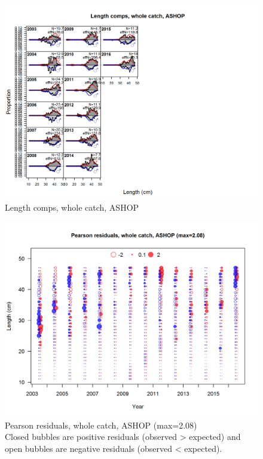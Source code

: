 \documentclass[12pt,]{article}
\begin{document}
\begin{figure}
\centering
\includegraphics{./r4ss/plots_mod1/comp_lenfit_flt2mkt0.png}
\caption{Length comps, whole catch, ASHOP
\label{fig:mod1_10_comp_lenfit_flt2mkt0}}
\end{figure}

\begin{figure}
\centering
\includegraphics{./r4ss/plots_mod1/comp_lenfit_residsflt2mkt0.png}
\caption{Pearson residuals, whole catch, ASHOP (max=2.08)\\
Closed bubbles are positive residuals (observed \textgreater{} expected)
and open bubbles are negative residuals (observed \textless{} expected).
\label{fig:mod1_11_comp_lenfit_residsflt2mkt0}}
\end{figure}
\end{document}
